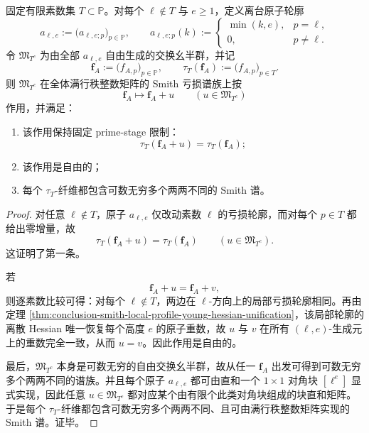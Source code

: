 \begin{theorem}\label{thm:conclusion-smith-offstage-atom-free-action}
固定有限素数集 \(T\subset\mathbb P\)。对每个 \(\ell\notin T\) 与 \(e\ge 1\)，定义离台原子轮廓
\[
a_{\ell,e}
:=
\bigl(a_{\ell,e;p}\bigr)_{p\in\mathbb P},
\qquad
a_{\ell,e;p}(k):=
\begin{cases}
\min(k,e),&p=\ell,\\
0,&p\neq \ell.
\end{cases}
\]
令 \(\mathfrak M_{T^c}\) 为由全部 \(a_{\ell,e}\) 自由生成的交换幺半群，并记
\[
\mathbf f_A:=\bigl(f_{A,p}\bigr)_{p\in\mathbb P},
\qquad
\tau_T(\mathbf f_A):=\bigl(f_{A,p}\bigr)_{p\in T}.
\]
则 \(\mathfrak M_{T^c}\) 在全体满行秩整数矩阵的 Smith 亏损谱族上按
\[
\mathbf f_A\longmapsto \mathbf f_A+u
\qquad(u\in \mathfrak M_{T^c})
\]
作用，并满足：
\begin{enumerate}
  \item 该作用保持固定 prime-stage 限制：
  \[
  \tau_T(\mathbf f_A+u)=\tau_T(\mathbf f_A);
  \]
  \item 该作用是自由的；
  \item 每个 \(\tau_T\)-纤维都包含可数无穷多个两两不同的 Smith 谱。
\end{enumerate}
\end{theorem}
\begin{proof}
对任意 \(\ell\notin T\)，原子 \(a_{\ell,e}\) 仅改动素数 \(\ell\) 的亏损轮廓，而对每个 \(p\in T\) 都给出零增量，故
\[
\tau_T(\mathbf f_A+u)=\tau_T(\mathbf f_A)
\qquad(u\in \mathfrak M_{T^c}).
\]
这证明了第一条。

若
\[
\mathbf f_A+u=\mathbf f_A+v,
\]
则逐素数比较可得：对每个 \(\ell\notin T\)，两边在 \(\ell\)-方向上的局部亏损轮廓相同。再由定理 \ref{thm:conclusion-smith-local-profile-young-hessian-unification}，该局部轮廓的离散 Hessian 唯一恢复每个高度 \(e\) 的原子重数，故 \(u\) 与 \(v\) 在所有 \((\ell,e)\)-生成元上的重数完全一致，从而 \(u=v\)。因此作用是自由的。

最后，\(\mathfrak M_{T^c}\) 本身是可数无穷的自由交换幺半群，故从任一 \(\mathbf f_A\) 出发可得到可数无穷多个两两不同的谱族。并且每个原子 \(a_{\ell,e}\) 都可由直和一个 \(1\times 1\) 对角块 \([\ell^e]\) 显式实现，因此任意 \(u\in\mathfrak M_{T^c}\) 都对应某个由有限个此类对角块组成的块直和矩阵。于是每个 \(\tau_T\)-纤维都包含可数无穷多个两两不同、且可由满行秩整数矩阵实现的 Smith 谱。证毕。
\end{proof}

